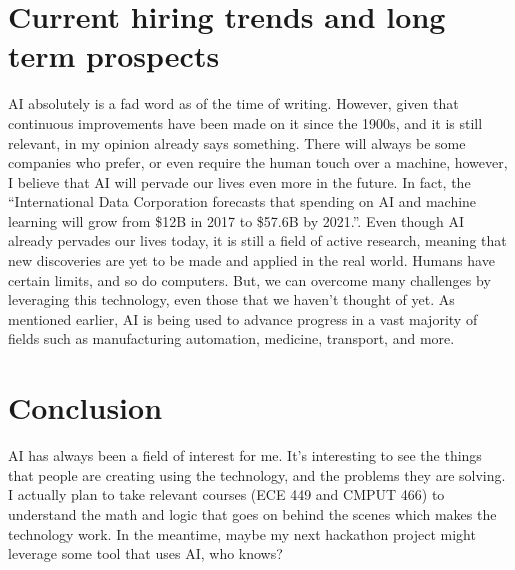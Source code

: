 \documentclass[letterpaper,12pt]{article}
\begin{document}
\section{Current hiring trends and long term prospects}

AI absolutely is a fad word as of the time of writing. However, given that continuous improvements
have been made on it since the 1900s, and it is still relevant, in my opinion already says something.
There will always be some companies who prefer, or even require the human touch
over a machine, however, I believe that AI will pervade our lives even more in the future.
In fact, the 
``International Data Corporation forecasts that spending on AI and machine learning will grow from \$12B in 2017 to \$57.6B by 2021.''.
\cite{forbesprojected}
Even though AI already pervades our lives today, 
it is still a field of active research\cite{uofaAI}, meaning that new
discoveries are yet to be made and applied in the real world.
Humans have certain limits, and so do computers. But, we can overcome many challenges by leveraging this technology,
even those that we haven't thought of yet. 
As mentioned earlier,
AI is being used to advance progress in a vast majority of fields
such as manufacturing automation, medicine, transport, and more.

\section{Conclusion}

AI has always been a field of interest for me.
It's interesting to see the things that people are creating
using the technology, and the problems they are solving.
I actually plan to take relevant courses (ECE 449 and CMPUT 466)
to understand the math and logic that goes on behind the scenes
which makes the technology work. In the meantime, maybe my next
hackathon project might leverage some tool that uses AI, who knows?


\singlespacing
\nocite{*}
\printbibliography
% 
% 
\end{document}
